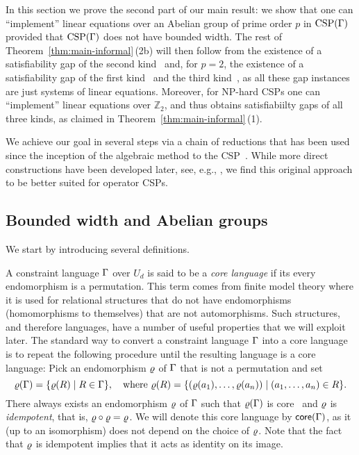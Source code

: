 \documentclass[11pt,letter]{article}
\begin{document}
In this section we prove the second part of our main result: we show that one
can ``implement'' linear equations over an Abelian group of prime order $p$
in ${\rm CSP}(\Gamma)$ provided that ${\rm CSP}(\Gamma)$ does not have bounded width. The rest
of Theorem~\ref{thm:main-informal}\,(2b) will then follow from the existence of a
satisfiability gap of the second kind~\cite{SZ24:personal} and, for $p=2$, the
existence of a satisfiability gap of the first
kind~\cite{Mermin1990simple,Mermin1993hidden,Peres1990incompatible} and the
third kind~\cite{Slofstra20:jams}, as all these gap instances are just systems
of linear equations. Moreover, for NP-hard CSPs one can ``implement'' linear
equations over $\mathbb{Z}_2$, and thus obtains satisfiabiilty gaps of all three
kinds, as claimed in Theorem~\ref{thm:main-informal}\,(1).

We achieve our goal in several steps via a chain of reductions that has been
used since the inception of the algebraic method to the
CSP~\cite{Bulatov05:classifying}. While more direct constructions have been
developed later, see, e.g., \cite{BKW17}, we find this original approach to be
better suited for operator CSPs.


\subsection{Bounded width and Abelian groups}

We start by introducing several definitions. 

A constraint language $\Gamma$ over $U_d$ is said to be a \emph{core language} if
its every endomorphism is a permutation.
This term comes from finite model theory where it is used for relational structures that do not have endomorphisms (homomorphisms to themselves) that are not automorphisms. Such structures, and therefore languages, have a number of useful properties that we will exploit later. The standard way to convert a constraint language $\Gamma$ into a core language is to repeat the following procedure until the resulting language is a core language: Pick an endomorphism $\varrho$ of $\Gamma$ that is not a permutation and set 
\[
\varrho(\Gamma)=\{\varrho(R)\mid R\in\Gamma\}, \quad\text{where } \varrho(R)=\{(\varrho(a_1),\ldots, \varrho(a_n))\mid  (a _1,\ldots, a _{n})\in R\}.
\]
There always exists an endomorphism $\varrho$ of $\Gamma$ such that $\varrho(\Gamma)$ is
core~\cite{Bulatov05:classifying,BKW17} and $\varrho$ is \emph{idempotent}, that is, $\varrho\circ\varrho=\varrho$. We will denote this core language by $\mathsf{core}(\Gamma)$, as it (up to an isomorphism) does not depend on the choice of $\varrho$. Note that the fact that $\varrho$ is idempotent implies that it acts as identity on its image.
\end{document}
